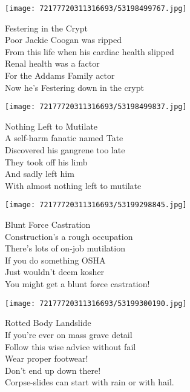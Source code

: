 \documentclass[10pt,letterpaper]{article}
\begin{document}
\begin{center}
\texttt{[image: 72177720311316693/53198499767.jpg]}
\end{center}
Festering in the Crypt\\
\vskip 0.2in
Poor Jackie Coogan was ripped\\
From this life when his cardiac health slipped\\
Renal health was a factor\\
For the Addams Family actor\\
Now he's Festering down in the crypt\\
\begin{center}

\end{center}
\pagebreak

\begin{center}\texttt{[image: 72177720311316693/53198499837.jpg]}
\end{center}
\begin{center}
Nothing Left to Mutilate\\
\vskip 0.2in
A self-harm fanatic named Tate\\
Discovered his gangrene too late\\
They took off his limb\\
And sadly left him\\
With almost nothing left to mutilate\\
\end{center}
\pagebreak

\begin{center}
\texttt{[image: 72177720311316693/53199298845.jpg]}
\end{center}

\begin{center}
Blunt Force Castration\\
\vskip 0.2in
Construction's a rough occupation\\
There's lots of on-job mutilation\\
If you do something OSHA\\
Just wouldn't deem kosher\\
You might get a blunt force castration!\\
\end{center}
\pagebreak

\begin{center}\texttt{[image: 72177720311316693/53199300190.jpg]}
\end{center}
\begin{center}
Rotted Body Landslide\\
\vskip 0.2in
If you're ever on mass grave detail\\
Follow this wise advice without fail\\
Wear proper footwear!\\
Don't end up down there!\\
Corpse-slides can start with rain or with hail.\\
\end{center}
\pagebreak
\end{document}
